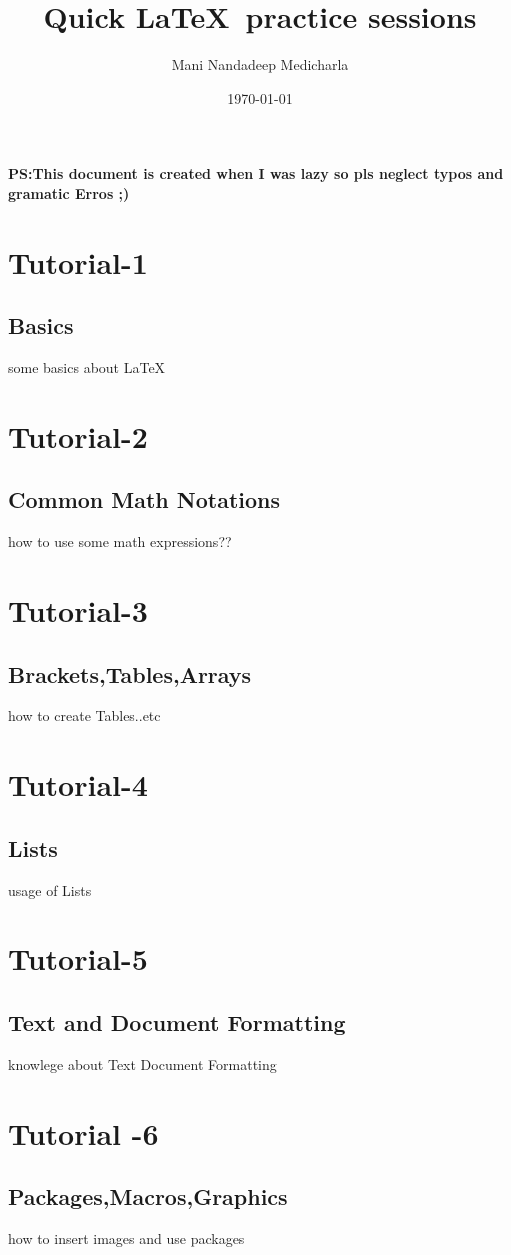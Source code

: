 \documentclass[11pt]{article}
\begin{document}
\tableofcontents

\title{Quick \LaTeX \ practice sessions}
\author{Mani Nandadeep Medicharla}
\date{\today}
\maketitle

\textbf{PS:This document is created when I was lazy so pls neglect typos and gramatic Erros ;)}

\section{Tutorial-1}
	\subsection{Basics}
	some basics about LaTeX
\section{Tutorial-2}
	\subsection{Common Math Notations}
	how to use some math expressions??
\section{Tutorial-3}
	\subsection{Brackets,Tables,Arrays}
	how to create Tables..etc
\section{Tutorial-4}
	\subsection{Lists}
	usage of Lists
\section{Tutorial-5}
	\subsection{Text and Document Formatting}
	knowlege about Text Document Formatting
\section{Tutorial -6}
	\subsection{Packages,Macros,Graphics}
	how to insert images and use packages
\end{document}
